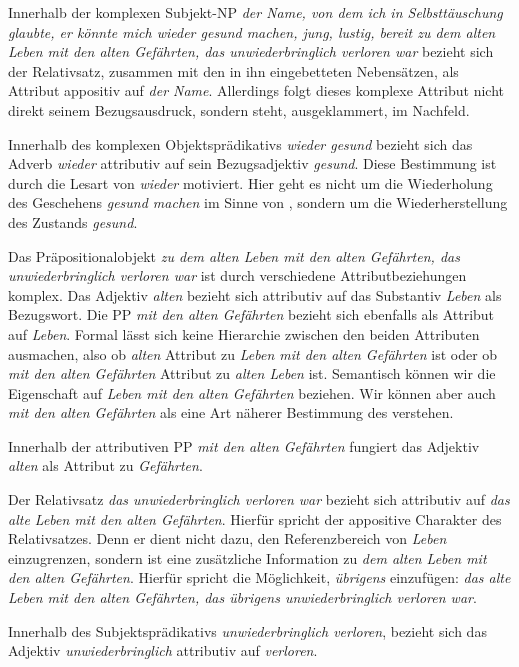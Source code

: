 Innerhalb der komplexen Subjekt-NP \textit{der Name, von dem ich in Selbsttäuschung glaubte, er könnte mich wieder gesund machen, jung, lustig, bereit zu dem alten Leben mit den alten Gefährten, das unwiederbringlich verloren war} bezieht sich der Relativsatz, zusammen mit den in ihn eingebetteten Nebensätzen, als Attribut appositiv auf \textit{der Name}. Allerdings folgt dieses komplexe Attribut nicht direkt seinem Bezugsausdruck, sondern steht, ausgeklammert, im Nachfeld.

Innerhalb des komplexen Objektsprädikativs \textit{wieder gesund} bezieht sich das Adverb \textit{wieder} attributiv auf sein Bezugsadjektiv \textit{gesund}. Diese Bestimmung ist durch die Lesart von \textit{wieder} motiviert. Hier geht es nicht um die Wiederholung des Geschehens \textit{gesund machen} im Sinne von , sondern um die Wiederherstellung des Zustands \textit{gesund}.

Das Präpositionalobjekt \textit{zu dem alten Leben mit den alten Gefährten, das unwiederbringlich verloren war} ist durch verschiedene Attributbeziehungen komplex. Das Adjektiv \textit{alten} bezieht sich attributiv auf das Substantiv \textit{Leben} als Bezugswort. Die PP \textit{mit den alten Gefährten} bezieht sich ebenfalls als Attribut auf \textit{Leben}. Formal lässt sich keine Hierarchie zwischen den beiden Attributen ausmachen, also ob \textit{alten} Attribut zu \textit{Leben mit den alten Gefährten} ist oder ob \textit{mit den alten Gefährten} Attribut zu \textit{alten Leben} ist. Semantisch können wir die Eigenschaft  auf \textit{Leben mit den alten Gefährten} beziehen. Wir können aber auch \textit{mit den alten Gefährten} als eine Art näherer Bestimmung des  verstehen.

Innerhalb der attributiven PP \textit{mit den alten Gefährten} fungiert das Adjektiv \textit{alten} als Attribut zu \textit{Gefährten}. 

Der Relativsatz \textit{das unwiederbringlich verloren war} bezieht sich attributiv auf \textit{das alte Leben mit den alten Gefährten}. Hierfür spricht der appositive Charakter des Relativsatzes. Denn er dient nicht dazu, den Referenzbereich von \textit{Leben} einzugrenzen, sondern ist eine zusätzliche Information zu \textit{dem alten Leben mit den alten Gefährten}. Hierfür spricht die Möglichkeit, \textit{übrigens} einzufügen: \textit{das alte Leben mit den alten Gefährten, das übrigens unwiederbringlich verloren war}. 

Innerhalb des Subjektsprädikativs \textit{unwiederbringlich verloren}, bezieht sich das Adjektiv \textit{unwiederbringlich} attributiv auf \textit{verloren}. 
